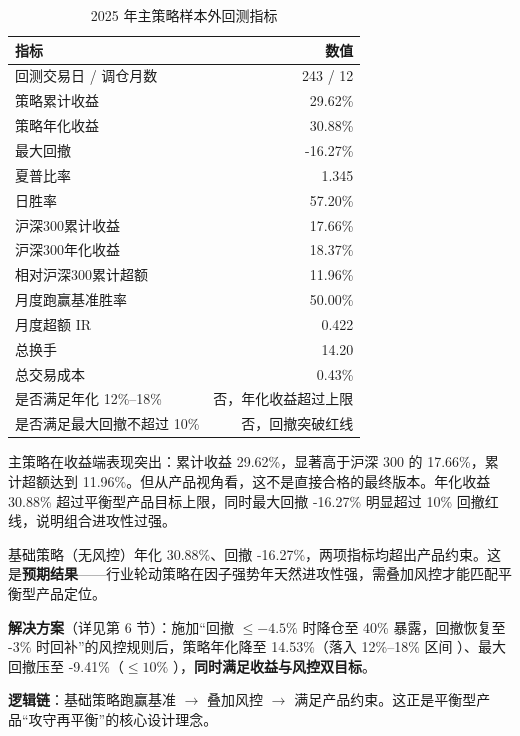 \documentclass[UTF8,a4paper,12pt]{ctexart}
\begin{document}
\begin{table}[H]
    \centering
    \caption{2025 年主策略样本外回测指标}
    \label{tab:primary-metrics}
    \begin{tabular}{L{0.44\textwidth}r}
        \toprule
        指标 & 数值 \\
        \midrule
        回测交易日 / 调仓月数 & 243 / 12 \\
        策略累计收益 & 29.62\% \\
        策略年化收益 & 30.88\% \\
        最大回撤 & -16.27\% \\
        夏普比率 & 1.345 \\
        日胜率 & 57.20\% \\
        沪深300累计收益 & 17.66\% \\
        沪深300年化收益 & 18.37\% \\
        相对沪深300累计超额 & 11.96\% \\
        月度跑赢基准胜率 & 50.00\% \\
        月度超额 IR & 0.422 \\
        总换手 & 14.20 \\
        总交易成本 & 0.43\% \\
        是否满足年化 12\%--18\% & 否，年化收益超过上限 \\
        是否满足最大回撤不超过 10\% & 否，回撤突破红线 \\
        \bottomrule
    \end{tabular}
\end{table}

主策略在收益端表现突出：累计收益 29.62\%，显著高于沪深 300 的 17.66\%，累计超额达到 11.96\%。但从产品视角看，这不是直接合格的最终版本。年化收益 30.88\% 超过平衡型产品目标上限，同时最大回撤 -16.27\% 明显超过 10\% 回撤红线，说明组合进攻性过强。

\begin{tcolorbox}[colback=red!5!white,colframe=red!75!black,title={\textbf{达标路线图（请老师注意）}}]
基础策略（无风控）年化 30.88\%、回撤 -16.27\%，两项指标均超出产品约束。这是\textbf{预期结果}——行业轮动策略在因子强势年天然进攻性强，需叠加风控才能匹配平衡型产品定位。

\textbf{解决方案}（详见第 6 节）：施加``回撤 $\leq -4.5\%$ 时降仓至 40\% 暴露，回撤恢复至 -3\% 时回补''的风控规则后，策略年化降至 14.53\%（落入 12\%--18\% 区间 \checkmark）、最大回撤压至 -9.41\%（$\leq 10\%$ \checkmark），\textbf{同时满足收益与风控双目标}。

\textbf{逻辑链}：基础策略跑赢基准 $\rightarrow$ 叠加风控 $\rightarrow$ 满足产品约束。这正是平衡型产品``攻守再平衡''的核心设计理念。
\end{tcolorbox}
\end{document}
